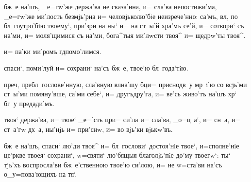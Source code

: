 


 бж~е на'шъ, _е=гw'же держа'ва не сказа'нна, и= 
сла'ва непостижи'ма, _е=гw'же ми'лость безмjь'рна и= 
человjьколю'бiе неизрече'нно: са'мъ, вл, по 
бл~гоутро'бiю твоему`, при'зри на ны` и= на ст~ы'й хра'мъ 
се'й, и= сотвори` съ на'ми, и= моля'щимися съ на'ми, 
бога^тыя ми'лwсти твоя^ и= щедрw'ты твоя^.


 и= па'ки ми'ромъ гд помо'лимся.


 спаси`, поми'луй и= сохрани` на'съ бж~е, 
твое'ю бл~года'тiю.


 преч, пребл~гослове'нную, сла'вную 
вл на'шу бц и= приснодв~у мр~i'ю со всjь'ми 
ст~ы'ми помяну'вше, са'ми себе`, и= другъдру'га, и= ве'сь 
живо'тъ на'шъ хр` бг~у предади'мъ.



 твоя` держа'ва, и= твое` _е='сть цр и= 
си'ла и= сла'ва, _о=ц~а`, и= сн~а, и= ст~а'гw дх~а, 
ны'нjь и= при'снw, и= во вjь'ки вjькw'въ.




 бж~е на'шъ, спаси` лю'ди твоя^ и= бл~гослови` 
достоя'нiе твое`, и=сполне'нiе це'ркве твоея` сохрани`, 
w=святи` лю'бящыя благолjь'пiе до'му твоегw`: ты` тjь'хъ 
воспросла'ви бж~е'ственною твое'ю си'лою, и= не w=ста'ви 
на'съ о_у=пова'ющихъ на тя`.

